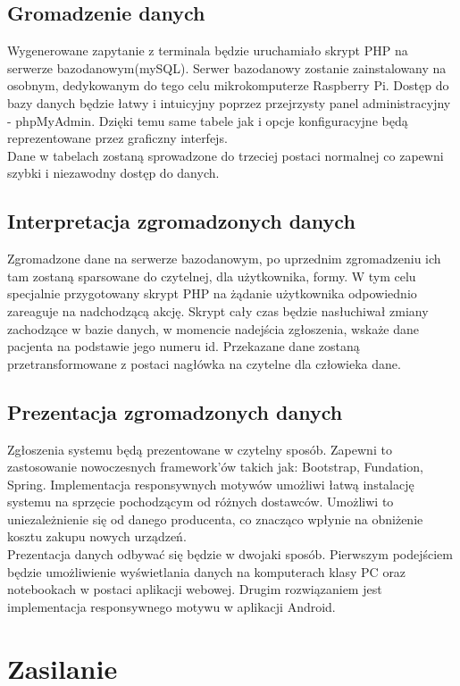 \documentclass[12pt]{article} %
\begin{document}
\subsection{Gromadzenie danych}
Wygenerowane zapytanie z terminala będzie uruchamiało skrypt PHP na serwerze bazodanowym(mySQL). Serwer bazodanowy zostanie zainstalowany na osobnym, dedykowanym do tego celu mikrokomputerze Raspberry Pi. Dostęp do bazy danych będzie łatwy i intuicyjny poprzez przejrzysty panel administracyjny - phpMyAdmin. Dzięki temu same tabele jak i opcje konfiguracyjne będą reprezentowane przez graficzny interfejs.\\
Dane w tabelach zostaną sprowadzone do trzeciej postaci normalnej co zapewni szybki i niezawodny dostęp do danych. 

\subsection{Interpretacja zgromadzonych danych}
Zgromadzone dane na serwerze bazodanowym, po uprzednim zgromadzeniu ich tam zostaną sparsowane do czytelnej, dla użytkownika, formy. W tym celu specjalnie przygotowany skrypt PHP na żądanie użytkownika odpowiednio zareaguje na nadchodzącą akcję. Skrypt cały czas będzie nasłuchiwał zmiany zachodzące w bazie danych, w momencie nadejścia zgłoszenia, wskaże dane pacjenta na podstawie jego numeru id. Przekazane dane zostaną przetransformowane z postaci nagłówka na czytelne dla człowieka dane.

\subsection{Prezentacja zgromadzonych danych}
Zgłoszenia systemu będą prezentowane w czytelny sposób. Zapewni to zastosowanie nowoczesnych framework'ów takich jak: Bootstrap, Fundation, Spring. Implementacja responsywnych motywów umożliwi łatwą instalację systemu na sprzęcie pochodzącym od różnych dostawców. Umożliwi to uniezależnienie się od danego producenta, co znacząco wpłynie na obniżenie kosztu zakupu nowych urządzeń. 
\\
Prezentacja danych odbywać się będzie w dwojaki sposób. Pierwszym podejściem będzie umożliwienie wyświetlania danych na komputerach klasy PC oraz notebookach w postaci aplikacji webowej. Drugim rozwiązaniem jest implementacja responsywnego motywu w aplikacji Android.

\section{Zasilanie}
\end{document}
